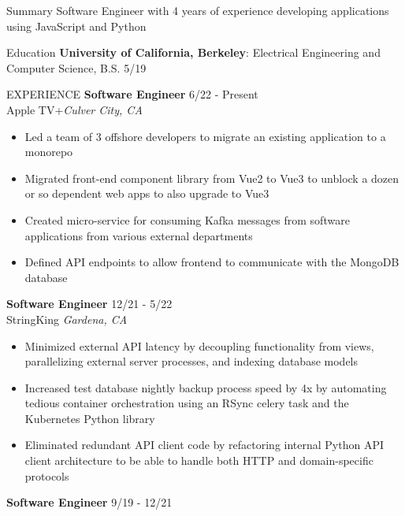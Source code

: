\documentclass{resume}
\begin{document}
    \begin{rSection}{Summary}
        {Software Engineer with 4 years of experience developing applications using JavaScript and Python}
    \end{rSection}

    \begin{rSection}{Education}
        {\bf University of California, Berkeley}: Electrical Engineering and Computer Science, B.S. \hfill {5/19}
    \end{rSection}

    \begin{rSection}{EXPERIENCE}
        \textbf{Software Engineer} \hfill 6/22 - Present\\
        Apple TV+\hfill \textit{Culver City, CA}
        \begin{itemize}
            \itemsep -3pt {} 
            \item Led a team of 3 offshore developers to migrate an existing application to a monorepo
            \item Migrated front-end component library from Vue2 to Vue3 to unblock a dozen or so dependent web apps to also upgrade to Vue3
            \item Created micro-service for consuming Kafka messages from software applications from various external departments
            \item Defined API endpoints to allow frontend to communicate with the MongoDB database
        \end{itemize}
        \textbf{Software Engineer} \hfill 12/21 - 5/22\\
        StringKing \hfill \textit{Gardena, CA}
        \begin{itemize}
            \itemsep -3pt {} 
            \item Minimized external API latency by decoupling functionality from views, parallelizing external server processes, and indexing database models
            \item Increased test database nightly backup process speed by 4x by automating tedious container orchestration using an RSync celery task and the Kubernetes Python library
            \item Eliminated redundant API client code by refactoring internal Python API client architecture to be able to handle both HTTP and domain-specific protocols
        \end{itemize}
        \textbf{Software Engineer} \hfill 9/19 - 12/21\\

\end{rSection}
\end{document}
